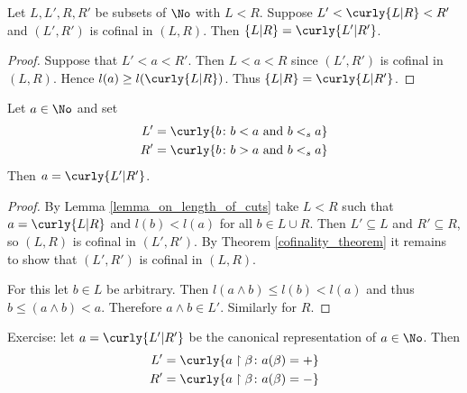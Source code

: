 \begin{theorem}
	Let $L, L', R, R'$ be subsets of $\No$ with 
	$L < R$. Suppose $L' < \curly{L \vert R} < R'$ and 
	$(L', R')$ is cofinal in $(L, R)$. Then $\left\{ L \vert 
	R\right\} = \curly{L' \vert R'}$. 
	\label{cofinality_theorem}
\end{theorem}
\begin{proof}
	Suppose that $L' < a < R'$. Then $L < a < R$ since 
	$(L', R')$ is cofinal in $(L, R)$. Hence 
	$l(a) \geq l( \curly{L \vert R})$. Thus 
	$\left\{ L \vert R \right\} = \curly{L \vert R'}$. 
\end{proof}
\begin{cor}
	Let $a \in \No$ and set 
	\begin{align*}
		L' &= \curly{b \colon b < a \text{ and } b <_s a} \\
		R' &= \curly{b \colon b > a \text{ and } b <_s a}
	\end{align*}
	Then $a = \curly{L' \vert R'}$. 
\end{cor}
\begin{proof}
	By Lemma \ref{lemma_on_length_of_cuts} take 
	$L < R$ such that $a = \curly{L \vert R}$ and 
	$l(b) < l(a)$ for all $b \in L \cup R$. Then 
	$L' \subseteq L$ and $R' \subseteq R$, so $(L, R)$ is 
	cofinal in $(L', R')$. By Theorem \ref{cofinality_theorem}
	it remains to show that $(L', R')$ is cofinal in 
	$(L, R)$. 

	For this let $b \in L$ be arbitrary. Then 
	$l(a \wedge b) \leq l(b) < l(a)$ and 
	thus $b \leq (a \wedge b) < a$. Therefore 
	$a \wedge b \in L'$. Similarly for $R$. 
\end{proof}
Exercise: let $a = \curly{L' \vert R'}$ be the canonical 
representation of $a \in \No$. Then 
\begin{align*}
	L' &= \curly{a \restriction \beta \colon a(\beta) = +} \\
	R' &= \curly{a \restriction \beta \colon a(\beta) = -}
\end{align*}

